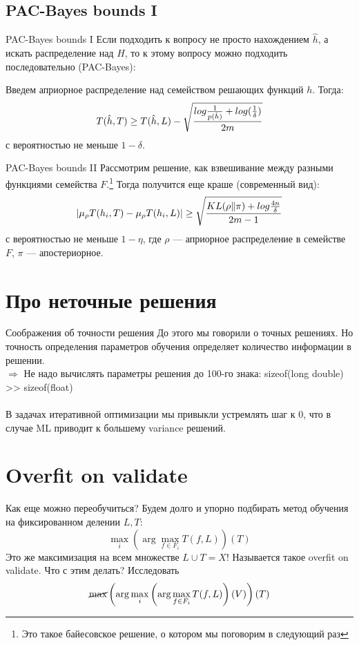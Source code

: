 \documentclass[14pt, fleqn, xcolor={dvipsnames, table}]{beamer}
\begin{document}
\subsection{PAC-Bayes bounds I}
\begin{frame}{PAC-Bayes bounds I}
\small
Если подходить к вопросу не просто нахождением $\hat{h}$, а искать распределение над $H$, то к этому вопросу можно подходить последовательно (PAC-Bayes):

\begin{definition}
Введем априорное распределение над семейством решающих функций $h$. Тогда:
$$
T(\hat{h}, T) \ge T(\hat{h}, L) - \sqrt{log \frac{1}{p(\hat{h})} + log(\frac{1}{\delta}) \over 2m}
$$
с вероятностью не меньше $1-\delta$.
\end{definition}
\end{frame}

\begin{frame}{PAC-Bayes bounds II}
\small
Рассмотрим решение, как взвешивание между разными функциями семейства $F$.\footnote{Это такое байесовское решение, о котором мы поговорим в следующий раз} Тогда получится еще краше (современный вид):
$$
|\mu_\rho T(h_i, T) - \mu_\rho T(h_i, L)| \ge \sqrt{KL(\rho \| \pi) + log \frac{4n}{\delta} \over 2m - 1}
$$
с вероятностью не меньше $1-\eta$, где $\rho$ --- априорное распределение в семействе $F$, $\pi$ --- апостериорное.
\end{frame}

\section{Про неточные решения}
\begin{frame}{Соображения об точности решения}
До этого мы говорили о точных решениях. Но точность определения параметров обучения определяет количество информации в решении. \\
$\Rightarrow$ Не надо вычислять параметры решения до 100-го знака: sizeof(long double) >> sizeof(float) \\
~\\
В задачах итеративной оптимизации мы привыкли устремлять шаг к 0, что в случае ML приводит к большему variance решений.
\end{frame}

\section{Overfit on validate}
\begin{frame}{Как еще можно переобучиться?}
Будем долго и упорно подбирать метод обучения на фиксированном делении $L, T$:
$$
\max_{i} \left(\arg\max_{f \in F_i} T(f, L)\right)(T)
$$
Это же максимизация на всем множестве $L \cup T = X$! Называется такое overfit on validate. Что с этим делать? Исследовать
$$
\cancel{\max} \left(\arg \max_{i} \left(\arg\max_{f \in F_i} T(f, L)\right)(V)\right)(T)
$$
\end{frame}
\end{document}
